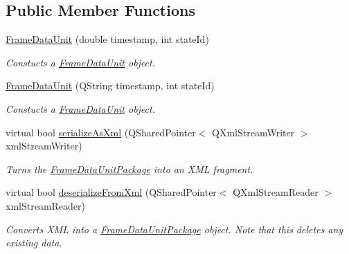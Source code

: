 \subsection*{Public Member Functions}
\begin{DoxyCompactItemize}
\item 
\hyperlink{class_picto_1_1_frame_data_unit_a87d2ec08f9452d36cc9c5e7ecb7c1908}{Frame\-Data\-Unit} (double timestamp, int state\-Id)
\begin{DoxyCompactList}\small\item\em Constucts a \hyperlink{class_picto_1_1_frame_data_unit}{Frame\-Data\-Unit} object. \end{DoxyCompactList}\item 
\hyperlink{class_picto_1_1_frame_data_unit_ad916198b5bcf14e9495bb84bdf990ff6}{Frame\-Data\-Unit} (Q\-String timestamp, int state\-Id)
\begin{DoxyCompactList}\small\item\em Constucts a \hyperlink{class_picto_1_1_frame_data_unit}{Frame\-Data\-Unit} object. \end{DoxyCompactList}\item 
virtual bool \hyperlink{class_picto_1_1_frame_data_unit_a88f06ad3057045dc6efb62932358efba}{serialize\-As\-Xml} (Q\-Shared\-Pointer$<$ Q\-Xml\-Stream\-Writer $>$ xml\-Stream\-Writer)
\begin{DoxyCompactList}\small\item\em Turns the \hyperlink{class_picto_1_1_frame_data_unit_package}{Frame\-Data\-Unit\-Package} into an X\-M\-L fragment. \end{DoxyCompactList}\item 
\hypertarget{class_picto_1_1_frame_data_unit_a9a2f1a37974e6a63cb8a3bdd312de05c}{virtual bool \hyperlink{class_picto_1_1_frame_data_unit_a9a2f1a37974e6a63cb8a3bdd312de05c}{deserialize\-From\-Xml} (Q\-Shared\-Pointer$<$ Q\-Xml\-Stream\-Reader $>$ xml\-Stream\-Reader)}\label{class_picto_1_1_frame_data_unit_a9a2f1a37974e6a63cb8a3bdd312de05c}

\begin{DoxyCompactList}\small\item\em Converts X\-M\-L into a \hyperlink{class_picto_1_1_frame_data_unit_package}{Frame\-Data\-Unit\-Package} object. Note that this deletes any existing data. \end{DoxyCompactList}\end{DoxyCompactItemize}
